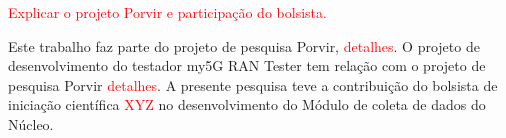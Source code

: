\textcolor{red}{Explicar o projeto Porvir e participação do bolsista.}

Este trabalho faz parte do projeto de pesquisa Porvir, \textcolor{red}{detalhes}. O projeto de desenvolvimento do testador my5G RAN Tester tem relação com o projeto de pesquisa Porvir \textcolor{red}{detalhes}. A presente pesquisa teve a contribuição do bolsista de iniciação científica \textcolor{red}{XYZ} no desenvolvimento do Módulo de coleta de dados do Núcleo.
